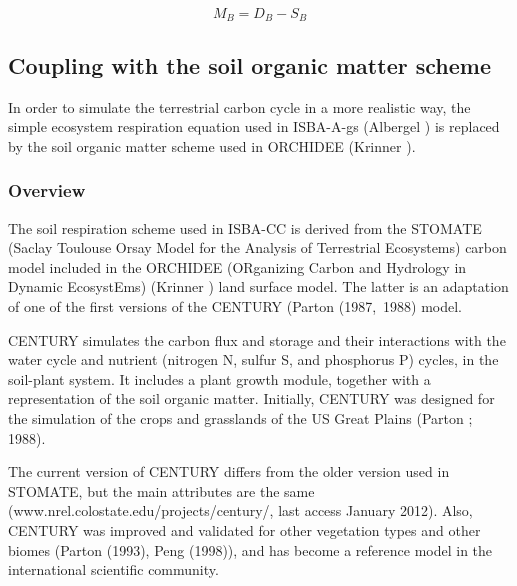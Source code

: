 {\begin{equation}
M_B = D_B - S_B
\label{eqmort}
\end{equation}



\subsection{{Coupling with the soil organic matter scheme}}
\label{sect:isbacc_soil}

In order to simulate the terrestrial carbon cycle in a more realistic way, 
the simple ecosystem respiration equation used in ISBA-A-gs (Albergel ) 
is replaced by the soil organic matter scheme used in ORCHIDEE (Krinner ).


\subsubsection{Overview}

The soil respiration scheme used in ISBA-CC is derived from the 
STOMATE (Saclay Toulouse Orsay Model for the Analysis of 
Terrestrial Ecosystems) carbon model 
included in the ORCHIDEE (ORganizing Carbon
and Hydrology in Dynamic EcosystEms) (Krinner ) land surface model. 
The latter is an adaptation of one of the first versions of the 
CENTURY (Parton \etal (1987,~1988)\nocite{Parton1987,Parton1988} model.

CENTURY simulates the carbon flux and storage and their interactions with the water cycle 
and nutrient (nitrogen N, sulfur S, and phosphorus P) cycles, in the soil-plant system.
It includes a plant growth module, together with a representation of the soil organic matter. 
Initially, CENTURY was designed for the simulation of the crops and grasslands 
of the US Great Plains (Parton ; 1988). 

The current version of CENTURY differs from the older version used in STOMATE, 
but the main attributes are the same 
(www.nrel.colostate.edu/projects/century/, last access January 2012).
Also, CENTURY was improved and validated for other vegetation types and other biomes 
(Parton \etal (1993)\nocite{Parton1993}, Peng \etal (1998)\nocite{Peng1998}), and has become a reference model in the international 
scientific community.

}
